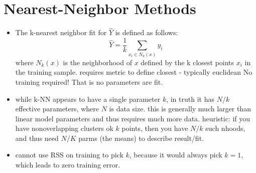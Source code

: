 \section{Nearest-Neighbor Methods}
\begin{itemize}
  \item The k-nearest neighbor fit for $\hat{Y}$ is defined as follows:
    $$ \hat{Y} = \frac{1}{k} \sum_{x_i \in N_k(x)} y_i $$
    where $N_k(x)$ is the neighborhood of $x$ defined by the k closest points $x_i$ in the training sample.
    \subitem requires metric to define closest - typically euclidean
    \subitem No training required! That is no parameters are fit.
  \item while k-NN appears to have a single parameter $k$, in truth it has $N/k$ effective parameters, where $N$ is data size.
    \subitem this is generally much larger than linear model parameters and thus requires much more data.
    \subitem heuristic: if you have nonoverlapping clusters ok $k$ points, then you have $N/k$ such nhoods, and thus need $N/K$ parms (the means) to describe result/fit.
  \item cannot use RSS on training to pick $k$, because it would always pick $k=1$, which leads to zero training error.
\end{itemize}

